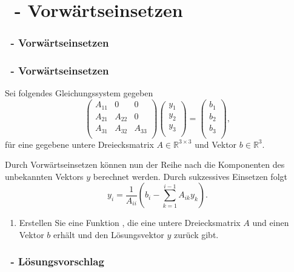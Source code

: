 \def\stitle{\theexercise\ - Vorw\"artseinsetzen}
\section{\stitle}
\begin{frame}
  \frametitle{\stitle}%
\tableofcontents[current]
\end{frame}


\begin{frame}%
  \frametitle{\stitle}%
Sei folgendes Gleichungssystem gegeben
\[
\begin{pmatrix}
A_{11} & 0  &  0 \\
A_{21} & A_{22}  &  0 \\
A_{31} & A_{32}  &  A_{33} \\
\end{pmatrix}
\begin{pmatrix}
y_{1} \\
y_{2} \\
y_{3} \\
\end{pmatrix}
=
\begin{pmatrix}
b_{1} \\
b_{2} \\
b_{3} \\
\end{pmatrix}
,
\]
für eine gegebene untere Dreiecksmatrix $ A \in \mathbb{R}^{3\times 3} $ und Vektor $ b \in \mathbb{R}^3 $.
\medskip

Durch Vorw\"artseinsetzen k\"onnen nun der Reihe nach die Komponenten des unbekannten Vektors $y$ berechnet werden.
Durch sukzessives Einsetzen folgt
\[
y_i=\frac{1}{A_{ii}}\left(b_i-\sum_{k=1}^{i-1}A_{ik}y_k\right).
\]
\begin{enumerate}
\item Erstellen Sie eine Funktion , die eine untere Dreiecksmatrix $ A $ und einen Vektor $ b $ erh\"alt und den L\"osungsvektor $ y $ zur\"uck gibt.
\end{enumerate}
\end{frame}


\begin{frame}%
  \frametitle{\theexercise\ - L\"osungsvorschlag}%

\end{frame}
